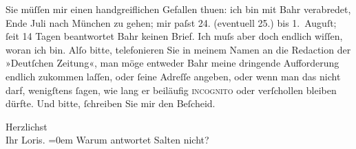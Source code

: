 \pstart
           Sie müſſen mir einen handgreiflichen Gefallen thuen: ich bin mit Bahr verabredet, Ende Juli nach München zu gehen; mir paſst 24.
               (eventuell 25.) bis 1. Auguſt;{ }ſeit 14 Tagen beantwortet
                  Bahr keinen Brief. Ich muſs aber doch
               endlich wiſſen, {\pb}woran ich bin.
               Alſo bitte, telefonieren Sie in meinem Namen an die Redaction der »Deutſchen Zeitung«, man möge entweder Bahr meine dringende Aufforderung endlich zukommen laſſen, oder{ }ſeine Adreſſe angeben, oder wenn man das nicht darf, wenigſtens{ }ſagen, wie lang er
               beiläufig \textsc{incognito} oder verſchollen bleiben dürfte. Und
               bitte,{ }ſchreiben Sie mir  den Beſcheid.\pend
           
\pstart
           Herzlichst{\\[\baselineskip]}Ihr \spacefill\mbox{Loris.}\pend
           \leftskip=0em{}
\pstart
           \noindent{}Warum antwortet Salten nicht?\pend
           \endnumbering{}  \newcommand{\dateiname}{L00238}\newcommand{\titel}{Hugo von Hofmannsthal an Arthur Schnitzler, 19. 7. 1893}\newcommand{\editorInnen}{Herausgegeben von Martin Anton Müller}
